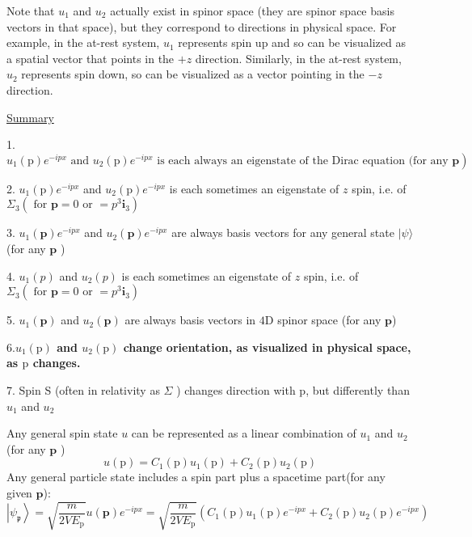 Note that $u_{1}$ and $u_{2}$ actually exist in spinor space (they are spinor space basis vectors in that space), but they correspond to directions in physical space. For example, in the at-rest system, $u_1$ represents spin up and so can be visualized as a spatial vector that points in the $+z$ direction. Similarly, in the at-rest system, $u_{2}$ represents spin down, so can be visualized as a vector pointing in the $-z$ direction. 
\begin{qt}
\underline{Summary}

1. $\left.u_{1}(\mathrm{p}) e^{-i p x} \text { and } u_{2}(\mathrm{p}) e^{-i p x} \text { is each always an eigenstate of the Dirac equation (for any } \mathbf{p}\right)$

2. $u_{1}(\mathrm{p}) e^{-i p x}$ and $u_{2}(\mathrm{p}) e^{-i p x}$ is each sometimes an eigenstate of $z$ spin, i.e. of $\Sigma_{3}\left(\text { for } \mathbf{p}=0 \text { or }=p^{3} \mathbf{i}_{3}\right)$

3. $u_{1}(\mathbf{p}) e^{-i p x}$ and $u_{2}(\mathbf{p}) e^{-i p x}$ are always basis vectors for any general state $|\psi\rangle$ (for any $\mathbf{p}$ )

4. $u_{1}(p)$ and $u_{2}(p)$ is each sometimes an eigenstate of $z$ spin, i.e. of $\Sigma_{3}\left(\text { for } \mathbf{p}=0 \text { or }=p^{3} \mathbf{i}_{3}\right)$

5. $u_{1}(\mathbf{p})$ and $u_{2}(\mathbf{p})$ are always basis vectors in $4 \mathrm{D}$ spinor space (for any $\mathbf{p}$) 

6.\textbf{$u_{1}(\mathrm{p})$ and $u_{2}(\mathrm{p})$ change orientation, as visualized in physical space, as $\mathrm{p}$ changes.}

7. Spin S (often in relativity as $\Sigma$ ) changes direction with p, but differently than $u_{1}$ and $u_{2}$
\end{qt}
Any general spin state $u$ can be represented as a linear combination of $u_{1}$ and  $u_{2}$ (for any $\mathbf{p}$ )
$$
u(\mathrm{p})=C_{1}(\mathrm{p}) u_{1}(\mathrm{p})+C_{2}(\mathrm{p}) u_{2}(\mathrm{p})
$$
Any general particle state includes a spin part plus a spacetime part(for any given $\mathbf{p}$):
$$
\left|\psi_{\mathfrak{p}}\right\rangle=\sqrt{\frac{m}{2 V E_{\mathrm{p}}}} u(\mathbf{p}) e^{-i p x}=\sqrt{\frac{m}{2 V E_{\mathrm{p}}}}\left(C_{1}(\mathrm{p}) u_{1}(\mathrm{p}) e^{-i p x}+C_{2}(\mathrm{p}) u_{2}(\mathrm{p}) e^{-i p x}\right)
$$